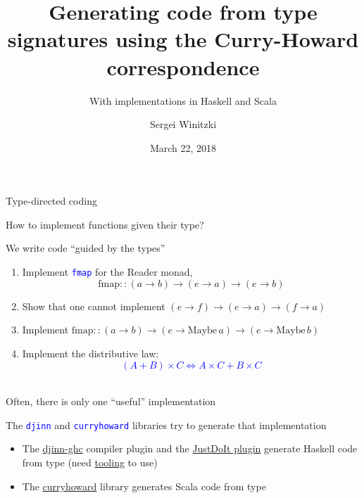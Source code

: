 \documentclass[english]{beamer}
\title[Generating code with Curry-Howard]{Generating code from type signatures
using the Curry-Howard correspondence}
\subtitle{With implementations in Haskell and Scala}
\author{Sergei Winitzki}
\date{March 22, 2018}
\institute[BAHUG]{Bay Area Haskell Users' Group}
\begin{document}
\frame{\titlepage}
\begin{frame}{Type-directed coding}

How to implement functions given their type?

We write code ``guided by the types''
\begin{enumerate}
\item Implement \texttt{\textcolor{blue}{\footnotesize{}fmap}} for the Reader
monad,{\footnotesize{}
\[
\text{fmap}::\left(a\rightarrow b\right)\rightarrow\left(e\rightarrow a\right)\rightarrow\left(e\rightarrow b\right)
\]
}{\footnotesize \par}
\item Show that one cannot implement{\footnotesize{} $\left(e\rightarrow f\right)\rightarrow\left(e\rightarrow a\right)\rightarrow\left(f\rightarrow a\right)$}{\footnotesize \par}
\item Implement {\footnotesize{}$\text{fmap}::\left(a\rightarrow b\right)\rightarrow\left(e\rightarrow\text{Maybe}\,a\right)\rightarrow\left(e\rightarrow\text{Maybe}\,b\right)$}{\footnotesize \par}
\item Implement the distributive law: \texttt{\textcolor{blue}{\footnotesize{}
\[
\left(A+B\right)\times C\Leftrightarrow A\times C+B\times C
\]
}}{\footnotesize \par}
\end{enumerate}
Often, there is only one ``useful'' implementation

The \texttt{\textcolor{blue}{\footnotesize{}djinn}} and \texttt{\textcolor{blue}{\footnotesize{}curryhoward}}
libraries try to generate that implementation
\begin{itemize}
\item The \href{https://hackage.haskell.org/package/djinn-ghc}{djinn-ghc}
compiler plugin and the \href{https://github.com/nomeata/ghc-justdoit}{JustDoIt plugin}
generate Haskell code from type (need \href{https://github.com/serras/emacs-haskell-tutorial/blob/master/tutorial.md\#working-with-holes}{tooling}
to use)
\item The \href{https://github.com/Chymyst/curryhoward}{curryhoward} library
generates Scala code from type 
\end{itemize}
\end{frame}
\end{document}
